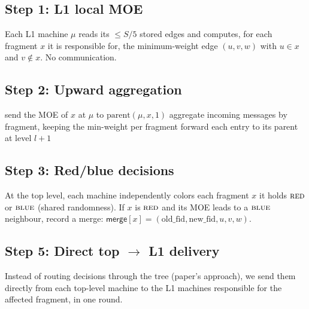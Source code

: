 \documentclass[11pt]{article}
\begin{document}
\subsection{Step 1: L1 local MOE}

Each L1 machine $\mu$ reads its $\le S/5$ stored edges and computes, for
each fragment $x$ it is responsible for, the minimum-weight edge
$(u, v, w)$ with $u \in x$ and $v \notin x$. No communication.

\subsection{Step 2: Upward aggregation}

\begin{algorithm}[h]
\caption{Upward MOE aggregation}
\label{alg:upward}
\begin{algorithmic}[1]
    \State send the MOE of $x$ at $\mu$ to $\text{parent}(\mu, x, 1)$
\EndFor
{}
        \State aggregate incoming messages by fragment, keeping
               the min-weight per fragment
            \State forward each entry to its parent at level $l + 1$
        \EndIf
    \EndFor
\EndFor
\end{algorithmic}
\end{algorithm}

\subsection{Step 3: Red/blue decisions}

At the top level, each machine independently colors each fragment $x$ it
holds $\textsc{red}$ or $\textsc{blue}$ (shared randomness). If $x$ is
$\textsc{red}$ and its MOE leads to a $\textsc{blue}$ neighbour, record a
merge: $\textsf{merge}[x] = (\text{old\_fid}, \text{new\_fid}, u, v, w)$.

\subsection{Step 5: Direct top \texorpdfstring{$\to$}{->} L1 delivery}

Instead of routing decisions through the tree (paper's approach), we send
them directly from each top-level machine to the L1 machines responsible
for the affected fragment, in one round.
\end{document}
